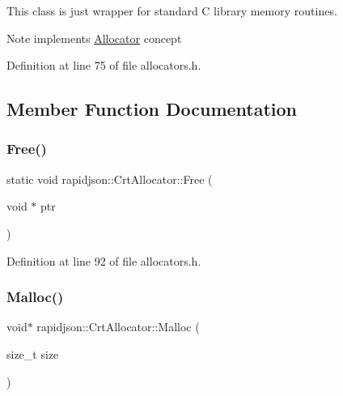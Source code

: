 This class is just wrapper for standard C library memory routines. \begin{DoxyNote}{Note}
implements \mbox{\hyperlink{classrapidjson_1_1_allocator}{Allocator}} concept 
\end{DoxyNote}


Definition at line 75 of file allocators.\+h.



\subsection{Member Function Documentation}
\mbox{\label{classrapidjson_1_1_crt_allocator_aae4f8a67d7815485fa70b0094e8dbc19}} 
\subsubsection{\texorpdfstring{Free()}{Free()}}
{\footnotesize\ttfamily static void rapidjson\+::\+Crt\+Allocator\+::\+Free (\begin{DoxyParamCaption}\item[{void $\ast$}]{ptr }\end{DoxyParamCaption})\hspace{0.3cm}{\ttfamily [static]}}



Definition at line 92 of file allocators.\+h.


\begin{DoxyCode}{0}

\end{DoxyCode}
\mbox{\label{classrapidjson_1_1_crt_allocator_aa3dab0aa1b00fc5b6e6cf29708e6667f}} 
\subsubsection{\texorpdfstring{Malloc()}{Malloc()}}
{\footnotesize\ttfamily void$\ast$ rapidjson\+::\+Crt\+Allocator\+::\+Malloc (\begin{DoxyParamCaption}\item[{size\+\_\+t}]{size }\end{DoxyParamCaption})}



